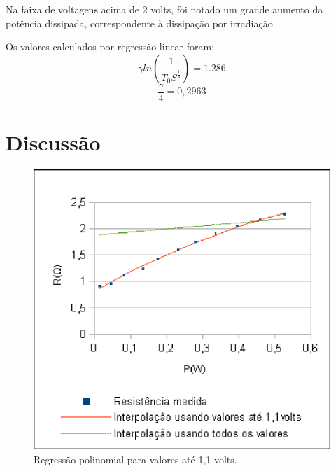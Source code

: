 \documentclass[brazilian,12pt,a4paper,final]{article}
\begin{document}
Na faixa de voltagens acima de 2 volts, foi notado um grande aumento da
potência dissipada, correspondente à dissipação por irradiação.

Os valores calculados por regressão linear foram:
$$\gamma ln(\frac{1}{T_0S^\frac{1}{4}}) = 1.286$$
$$\frac{\gamma}{4}=0,2963$$

\section{Discussão}

\begin{figure}[htbp!]
  \caption{Regressão polinomial para valores até 1,1 volts.}
  \label{figiniciopeq}
  \centering
    \includegraphics{iniciopeq.eps}
\end{figure}
\end{document}
